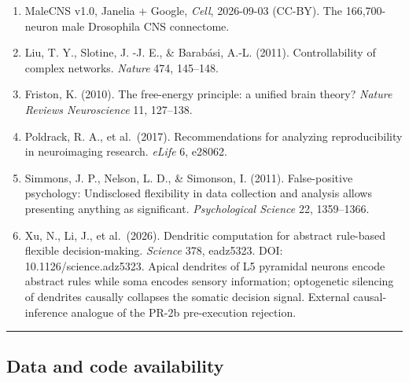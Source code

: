 \documentclass[
]{article}
\providecommand{\tightlist}{%
  \setlength{\itemsep}{0pt}\setlength{\parskip}{0pt}}
\begin{document}
\begin{enumerate}
\def\labelenumi{\arabic{enumi}.}
\tightlist
\item
  MaleCNS v1.0, Janelia + Google, \emph{Cell}, 2026-09-03 (CC-BY). The
  166,700-neuron male Drosophila CNS connectome.
\item
  Liu, T. Y., Slotine, J. -J. E., \& Barabási, A.-L. (2011).
  Controllability of complex networks. \emph{Nature} 474, 145--148.
\item
  Friston, K. (2010). The free-energy principle: a unified brain theory?
  \emph{Nature Reviews Neuroscience} 11, 127--138.
\item
  Poldrack, R. A., et al.~(2017). Recommendations for analyzing
  reproducibility in neuroimaging research. \emph{eLife} 6, e28062.
\item
  Simmons, J. P., Nelson, L. D., \& Simonson, I. (2011). False-positive
  psychology: Undisclosed flexibility in data collection and analysis
  allows presenting anything as significant. \emph{Psychological
  Science} 22, 1359--1366.
\item
  Xu, N., Li, J., et al.~(2026). Dendritic computation for abstract
  rule-based flexible decision-making. \emph{Science} 378, eadz5323.
  DOI: 10.1126/science.adz5323. Apical dendrites of L5 pyramidal neurons
  encode abstract rules while soma encodes sensory information;
  optogenetic silencing of dendrites causally collapses the somatic
  decision signal. External causal-inference analogue of the PR-2b
  pre-execution rejection.
\end{enumerate}

\begin{center}\rule{0.5\linewidth}{0.5pt}\end{center}

\subsection{Data and code
availability}\label{data-and-code-availability}
\end{document}
